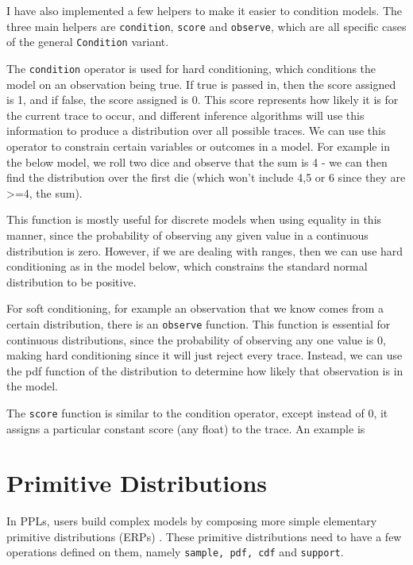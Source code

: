I have also implemented a few helpers to make it easier to condition models. The three main helpers are \texttt{condition}, \texttt{score} and \texttt{observe}, which are all specific cases of the general \texttt{Condition} variant. 

The \texttt{condition} operator is used for hard conditioning, which conditions the model on an observation being true. If true is passed in, then the score assigned is 1, and if false, the score assigned is 0. This score represents how likely it is for the current trace to occur, and different inference algorithms will use this information to produce a distribution over all possible traces. We can use this operator to constrain certain variables or outcomes in a model. For example in the below model, we roll two dice and observe that the sum is 4 - we can then find the distribution over the first die (which won't include 4,5 or 6 since they are >=4, the sum).

	
This function is mostly useful for discrete models when using equality in this manner, since the probability of observing any given value in a continuous distribution is zero. However, if we are dealing with ranges, then we can use hard conditioning as in the model below, which constrains the standard normal distribution to be positive.


For soft conditioning, for example an observation that we know comes from a certain distribution, there is an \texttt{observe} function. This function is essential for continuous distributions, since the probability of observing any one value is 0, making hard conditioning since it will just reject every trace. Instead, we can use the pdf function of the distribution to determine how likely that observation is in the model.

The \texttt{score} function is similar to the condition operator, except instead of 0, it assigns a particular constant score (any float) to the trace. An example is %

\section{Primitive Distributions}
In PPLs, users build complex models by composing more simple elementary primitive distributions (ERPs) \cite{pmlr-v15-wingate11a}. These primitive distributions need to have a few operations defined on them, namely \texttt{sample, pdf, cdf} and \texttt{support}.

